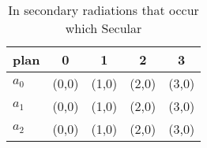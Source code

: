 \documentclass[a4paper]{article}
\begin{document}
\begin{table}
\begin{adjustbox}{width=0.6\columnwidth}
\begin{tabular}{|l|l|l|l|l|}
\hline
\textbf{plan} & \multicolumn{1}{c|}{\textbf{0}} & \multicolumn{1}{c|}{\textbf{1}} & \multicolumn{1}{c|}{\textbf{2}} & \multicolumn{1}{c|}{\textbf{3}} \\ \hline
\textbf{$a_0$}  & (0,0) & (1,0) & (2,0) & (3,0) \\ \hline
\textbf{$a_1$}  & (0,0) & (1,0) & (2,0) & (3,0) \\ \hline
\textbf{$a_2$}  & (0,0) & (1,0) & (2,0) & (3,0) \\ \hline
\end{tabular}
\end{adjustbox}
\caption{In secondary radiations that occur which Secular 
}
\end{table}
\end{document}
